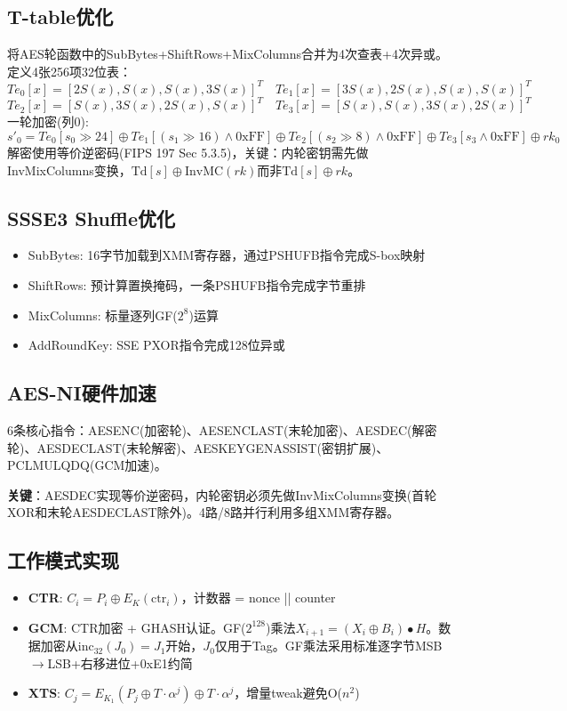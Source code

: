 \documentclass[12pt,a4paper]{ctexart}
\begin{document}
\subsection{T-table优化}
将AES轮函数中的SubBytes+ShiftRows+MixColumns合并为4次查表+4次异或。定义4张256项32位表：
\[Te_0[x]=[2S(x),S(x),S(x),3S(x)]^T\quad Te_1[x]=[3S(x),2S(x),S(x),S(x)]^T\]
\[Te_2[x]=[S(x),3S(x),2S(x),S(x)]^T\quad Te_3[x]=[S(x),S(x),3S(x),2S(x)]^T\]
一轮加密(列0):
\[s'_0=Te_0[s_0\gg 24]\oplus Te_1[(s_1\gg 16)\wedge 0\text{xFF}]\oplus Te_2[(s_2\gg 8)\wedge 0\text{xFF}]\oplus Te_3[s_3\wedge 0\text{xFF}]\oplus rk_0\]
解密使用等价逆密码(FIPS 197 Sec 5.3.5)，关键：内轮密钥需先做InvMixColumns变换，$\text{Td}[s]\oplus\text{InvMC}(rk)$而非$\text{Td}[s]\oplus rk$。

\subsection{SSSE3 Shuffle优化}
\begin{itemize}[itemsep=2pt]
\item SubBytes: 16字节加载到XMM寄存器，通过PSHUFB指令完成S-box映射
\item ShiftRows: 预计算置换掩码，一条PSHUFB指令完成字节重排
\item MixColumns: 标量逐列GF($2^8$)运算
\item AddRoundKey: SSE PXOR指令完成128位异或
\end{itemize}

\subsection{AES-NI硬件加速}
6条核心指令：AESENC(加密轮)、AESENCLAST(末轮加密)、AESDEC(解密轮)、AESDECLAST(末轮解密)、AESKEYGENASSIST(密钥扩展)、PCLMULQDQ(GCM加速)。

\textbf{关键}：AESDEC实现等价逆密码，内轮密钥必须先做InvMixColumns变换(首轮XOR和末轮AESDECLAST除外)。4路/8路并行利用多组XMM寄存器。

\subsection{工作模式实现}
\begin{itemize}[itemsep=2pt]
\item \textbf{CTR}: $C_i = P_i \oplus E_K(\text{ctr}_i)$，计数器 = nonce || counter
\item \textbf{GCM}: CTR加密 + GHASH认证。GF($2^{128}$)乘法$X_{i+1}=(X_i\oplus B_i)\bullet H$。数据加密从$\text{inc}_{32}(J_0)=J_1$开始，$J_0$仅用于Tag。GF乘法采用标准逐字节MSB$\to$LSB+右移进位+0xE1约简
\item \textbf{XTS}: $C_j=E_{K_1}(P_j\oplus T\cdot\alpha^j)\oplus T\cdot\alpha^j$，增量tweak避免O($n^2$)
\end{itemize}
\end{document}
